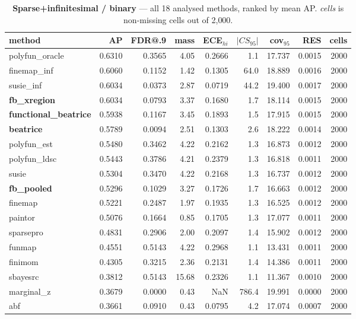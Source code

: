\begin{table}[htbp]\centering\small
\caption{\textbf{Sparse+infinitesimal / binary} --- all 18 analysed methods, ranked by mean AP. \emph{cells} is non-missing cells out of 2{,}000.}
\label{tab:main-sparse_inf-binary}
\begin{tabular}{lrrrrrrr r}\toprule
method & AP & FDR@.9 & mass & ECE$_{hi}$ & $|CS_{95}|$ & cov$_{95}$ & RES & cells\\\midrule
polyfun\_oracle & 0.6310 & 0.3565 & 4.05 & 0.2666 & 1.1 & 17.737 & 0.0015 & 2000\\
finemap\_inf & 0.6060 & 0.1152 & 1.42 & 0.1305 & 64.0 & 18.889 & 0.0016 & 2000\\
susie\_inf & 0.6034 & 0.0373 & 2.87 & 0.0719 & 44.2 & 19.400 & 0.0017 & 2000\\
\textbf{fb\_xregion} & 0.6034 & 0.0793 & 3.37 & 0.1680 & 1.7 & 18.114 & 0.0015 & 2000\\
\textbf{functional\_beatrice} & 0.5938 & 0.1167 & 3.45 & 0.1893 & 1.5 & 17.915 & 0.0015 & 2000\\
\textbf{beatrice} & 0.5789 & 0.0094 & 2.51 & 0.1303 & 2.6 & 18.222 & 0.0014 & 2000\\
polyfun\_est & 0.5480 & 0.3462 & 4.22 & 0.2162 & 1.3 & 16.873 & 0.0012 & 2000\\
polyfun\_ldsc & 0.5443 & 0.3786 & 4.21 & 0.2379 & 1.3 & 16.818 & 0.0011 & 2000\\
susie & 0.5304 & 0.3470 & 4.22 & 0.2168 & 1.3 & 16.737 & 0.0012 & 2000\\
\textbf{fb\_pooled} & 0.5296 & 0.1029 & 3.27 & 0.1726 & 1.7 & 16.663 & 0.0012 & 2000\\
finemap & 0.5221 & 0.2487 & 1.97 & 0.1935 & 1.3 & 16.525 & 0.0012 & 2000\\
paintor & 0.5076 & 0.1664 & 0.85 & 0.1705 & 1.3 & 17.077 & 0.0011 & 2000\\
sparsepro & 0.4831 & 0.2906 & 2.00 & 0.2097 & 1.4 & 15.902 & 0.0012 & 2000\\
funmap & 0.4551 & 0.5143 & 4.22 & 0.2968 & 1.1 & 13.431 & 0.0011 & 2000\\
finimom & 0.4305 & 0.3215 & 2.36 & 0.2131 & 1.4 & 14.386 & 0.0011 & 2000\\
sbayesrc & 0.3812 & 0.5143 & 15.68 & 0.2326 & 1.1 & 11.367 & 0.0010 & 2000\\
marginal\_z & 0.3679 & 0.0000 & 0.43 & NaN & 786.4 & 19.991 & 0.0000 & 2000\\
abf & 0.3661 & 0.0910 & 0.43 & 0.0795 & 4.2 & 17.074 & 0.0007 & 2000\\
\bottomrule\end{tabular}\end{table}
